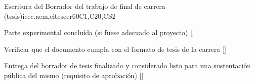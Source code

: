 \begin{syllabus}
\begin{unit}{Escritura del Borrador del trabajo de final de carrera (tesis)}{}{ieee,acm,citeseer}{60}{C1,C20,CS2}
\begin{learningoutcomes}
    \item Parte experimental concluída (si fuese adecuado al proyecto) [\Assessment]
    \item Verificar que el documento cumpla con el formato de tesis de la carrera [\Assessment]
    \item Entrega del borrador de tesis finalizado y considerado listo para una sustentación pública del mismo (requisito de aprobación) [\Assessment]
\end{learningoutcomes}
\end{unit}



\begin{coursebibliography}
\end{coursebibliography}
\end{syllabus}
